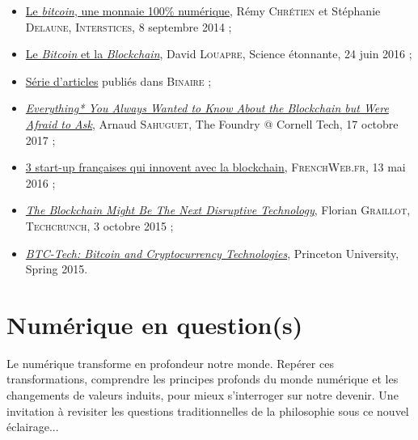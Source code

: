 \begin{gofurther}[before skip=12pt]
\begin{itemize}\jazzitem
\item \href{https://interstices.info/le-bitcoin-une-monnaie-100-numerique/}{Le \textit{bitcoin}, une monnaie 100\% numérique}, Rémy \textsc{Chrétien} et Stéphanie \textsc{Delaune}, \textsc{Interstices}, 8 septembre 2014 ;
\item \href{https://sciencetonnante.wordpress.com/2016/06/24/le-bitcoin-et-la-blockchain/}{Le \textit{Bitcoin} et la \textit{Blockchain}}, David \textsc{Louapre}, Science étonnante, 24 juin 2016 ;
\item \href{https://www.lemonde.fr/blog/binaire/?s=blockchain}{Série d'articles} publiés dans \textsc{Binaire} ;
\item \href{https://medium.com/cornell-tech/everything-you-always-wanted-to-know-about-icos-but-were-afraid-to-ask-b9728dc38b81}{\textit{Everything* You Always Wanted to Know About the Blockchain but Were Afraid to Ask}}, Arnaud \textsc{Sahuguet}, The Foundry @ Cornell Tech, 17 octobre 2017 ;
\item \href{https://www.frenchweb.fr/3-start-up-francaises-qui-innovent-avec-la-blockchain/239443#gsc.tab=0}{3 start-up françaises qui innovent avec la blockchain}, \textsc{FrenchWeb.fr}, 13 mai 2016 ;
\item \href{https://techcrunch.com/2015/10/03/the-blockchain-might-be-the-next-disruptive-technology/?ncid=rss&guccounter=1}{\textit{The Blockchain Might Be The Next Disruptive Technology}}, Florian \textsc{Graillot}, \textsc{Techcrunch}, 3 octobre 2015 ;
\item \href{https://piazza.com/princeton/spring2015/btctech/resources}{\textit{BTC-Tech: Bitcoin and Cryptocurrency Technologies}}, Princeton University, Spring 2015.
\end{itemize}
\end{gofurther}


\section[Numérique en question(s)]{Numérique en question(s)}
\label{sec:II.4}

Le numérique transforme en profondeur notre monde. Repérer ces transformations, comprendre les principes profonds du monde numérique et les changements de valeurs induits, pour mieux s'interroger sur notre devenir. Une invitation à revisiter les questions traditionnelles de la philosophie sous ce nouvel éclairage...

